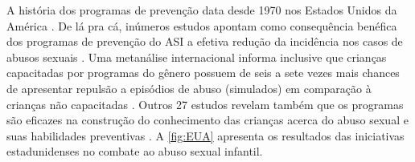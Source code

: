A história dos programas de prevenção data desde 1970 nos Estados Unidos da América \cite{plummer1999history}. De lá pra cá, inúmeros estudos apontam como consequência benéfica dos programas de prevenção do ASI a efetiva redução da incidência nos casos de abusos sexuais \cite{maria2010papel}. Uma metanálise internacional informa inclusive que crianças capacitadas por programas do gênero possuem de seis a sete vezes mais chances de apresentar repulsão a episódios de abuso (simulados) em comparação à crianças não capacitadas \cite{finkelhor2009prevention}. Outros 27 estudos revelam também que os programas são eficazes na construção do conhecimento das crianças acerca do abuso sexual e suas habilidades preventivas \cite{collin2013lessons}. A \autoref{fig:EUA} apresenta os resultados das iniciativas estadunidenses no combate ao abuso sexual infantil.



